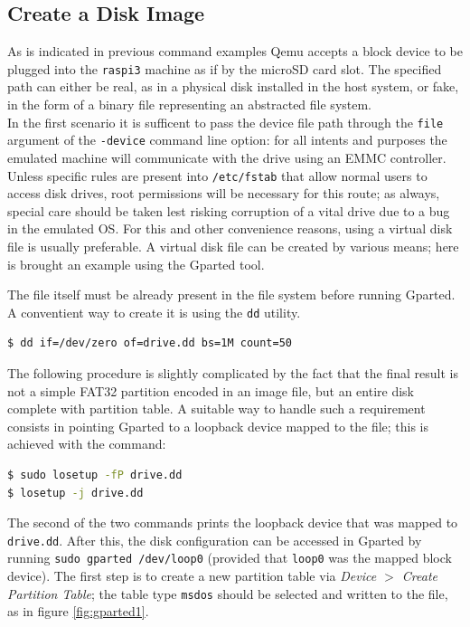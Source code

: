 \documentclass[12pt,a4paper,openright,twoside]{report}
\begin{document}
\subsection{Create a Disk Image}
As is indicated in previous command examples Qemu accepts a block device to be 
plugged into the {\tt raspi3} machine as if by the microSD card slot.
The specified path can either be real, as in a physical disk installed in the 
host system, or fake, in the form of a binary file representing an abstracted 
file system.\\
In the first scenario it is sufficent to pass the device file path through the
{\tt file} argument of the {\tt -device} command line option: for all intents and purposes
the emulated machine will communicate with the drive using an EMMC controller.
Unless specific rules are present into {\tt /etc/fstab} that allow normal users 
to access disk drives, root permissions will be necessary for this route; as always, special
care should be taken lest risking corruption of a vital drive due to a bug in the emulated OS.
For this and other convenience reasons, using a virtual disk file is usually preferable. A 
virtual disk file can be created by various means; here is brought an example 
using the Gparted tool.

The file itself must be already present in the file system before running Gparted. 
A conventient way to create it is using the {\tt dd} utility.

\begin{lstlisting}[language=sh]
$ dd if=/dev/zero of=drive.dd bs=1M count=50
\end{lstlisting}

The following procedure is slightly complicated by the fact that the final result
is not a simple FAT32 partition encoded in an image file, but an entire disk complete
with partition table. A suitable way to handle such a requirement consists in pointing
Gparted to a loopback device mapped to the file; this is achieved with the command:

\begin{lstlisting}[language=sh]
$ sudo losetup -fP drive.dd
$ losetup -j drive.dd
\end{lstlisting}

The second of the two commands prints the loopback device that was mapped to 
{\tt drive.dd}.
After this, the disk configuration can be accessed in Gparted by running 
{\tt sudo gparted /dev/loop0} (provided that {\tt loop0} was the mapped block
device).
The first step is to create a new partition table via \textit{Device $>$ Create
Partition Table}; the table type {\tt msdos} should be selected and written to the
file, as in figure \ref{fig:gparted1}.
\end{document}
